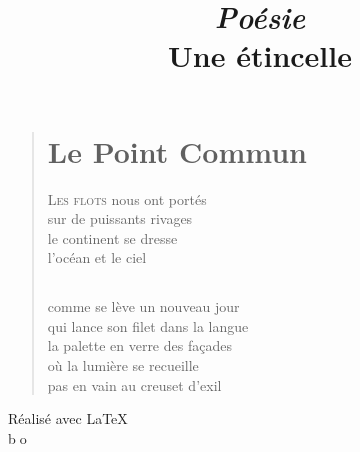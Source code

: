 \documentclass[a4paper,12pt,openright]{book}
\begin{document}
\newcommand{\lb}[1]{\color{lightblue} #1}

  \newcommand{\bleu}[1]{\color{bleu} #1}

\pagestyle{empty}
\title{\hbox{}
       \huge\bf
       \textit{Poésie}       
\\
  {\bleu Une étincelle}
  \\ 
       }
\date{}
\maketitle
\begin{verse}
\settowidth{\versewidth}{de nouveau de nous}
\vspace{1cm}
\chapter*{Le Point Commun}
\vspace{1cm}
{\lettrine[lines=1]{\textcolor[gray]{0.6}{L}}{\space es flots} nous ont portés}\\
sur de puissants rivages\\
le continent se dresse\\
l'océan et le ciel

\section*{}
comme se lève un nouveau jour\\
qui lance son filet dans la langue\\
la palette en verre des façades\\
où la lumière se recueille\\
pas en vain au creuset d'exil

\vspace{2cm}
\begin{center}
\end{center}



\end{verse}





\vfill




\begin{center}
\baselineskip=60pt 

\vspace*{12.5cm}
Réalisé avec \LaTeX
\\
\vspace*{1.5cm}
{\lb \LARGE \textcircled {bo}}
\end{center}
\end{document}
